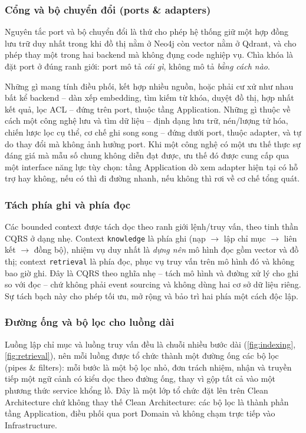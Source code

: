 \subsubsection{Cổng và bộ chuyển đổi (ports \& adapters)}

Nguyên tắc port và bộ chuyển đổi là thứ cho phép hệ thống giữ một hợp đồng lưu trữ duy nhất trong khi đồ thị nằm ở Neo4j còn vector nằm ở Qdrant, và cho phép thay một trong hai backend mà không đụng code nghiệp vụ. Chìa khóa là đặt port ở đúng ranh giới: port mô tả \textit{cái gì}, không mô tả \textit{bằng cách nào}.

Những gì mang tính điều phối, kết hợp nhiều nguồn, hoặc phải cư xử như nhau bất kể backend -- dàn xếp embedding, tìm kiếm từ khóa, duyệt đồ thị, hợp nhất kết quả, lọc ACL -- đứng trên port, thuộc tầng Application. Những gì thuộc về cách một công nghệ lưu và tìm dữ liệu -- định dạng lưu trữ, nén/lượng tử hóa, chiến lược lọc cụ thể, cơ chế ghi song song -- đứng dưới port, thuộc adapter, và tự do thay đổi mà không ảnh hưởng port. Khi một công nghệ có một ưu thế thực sự đáng giá mà mẫu số chung không diễn đạt được, ưu thế đó được cung cấp qua một interface năng lực tùy chọn: tầng Application dò xem adapter hiện tại có hỗ trợ hay không, nếu có thì đi đường nhanh, nếu không thì rơi về cơ chế tổng quát.

\subsubsection{Tách phía ghi và phía đọc}

Các bounded context được tách dọc theo ranh giới lệnh/truy vấn, theo tinh thần CQRS ở dạng nhẹ. Context \texttt{knowledge} là phía ghi (nạp $\rightarrow$ lập chỉ mục $\rightarrow$ liên kết $\rightarrow$ đồng bộ), nhiệm vụ duy nhất là \textit{dựng nên} mô hình đọc gồm vector và đồ thị; context \texttt{retrieval} là phía đọc, phục vụ truy vấn trên mô hình đó và không bao giờ ghi. Đây là CQRS theo nghĩa nhẹ -- tách mô hình và đường xử lý cho ghi so với đọc -- chứ không phải event sourcing và không dùng hai cơ sở dữ liệu riêng. Sự tách bạch này cho phép tối ưu, mở rộng và bảo trì hai phía một cách độc lập.

\subsubsection{Đường ống và bộ lọc cho luồng dài}

Luồng lập chỉ mục và luồng truy vấn đều là chuỗi nhiều bước dài (\ref{fig:indexing},\ref{fig:retrieval}), nên mỗi luồng được tổ chức thành một đường ống các bộ lọc (pipes \& filters): mỗi bước là một bộ lọc nhỏ, đơn trách nhiệm, nhận và truyền tiếp một ngữ cảnh có kiểu dọc theo đường ống, thay vì gộp tất cả vào một phương thức service khổng lồ. Đây là một lớp tổ chức đặt lên trên Clean Architecture chứ không thay thế Clean Architecture: các bộ lọc là thành phần tầng Application, điều phối qua port Domain và không chạm trực tiếp vào Infrastructure.

